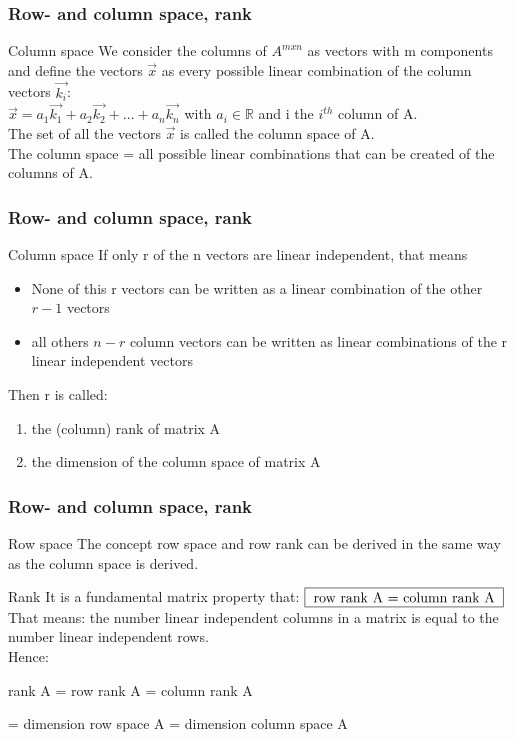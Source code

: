 \begin{frame}
	\frametitle{Row- and column space, rank}
	\begin{block}{Column space}
		We consider the columns of $A^{mxn}$ as vectors with m components and define the vectors $\overrightarrow{x}$ as every possible linear combination of the column vectors $\overrightarrow{k_i}$:\\
		$\overrightarrow{x}=a_1\overrightarrow{k_1}+a_2\overrightarrow{k_2}+...+a_n\overrightarrow{k_n}$ with $a_i\in\mathbb{R}$ and i the $i^{th}$ column of A.\\
		The set of all the vectors $\overrightarrow{x}$ is called the column space of A.\\
		The column space = all possible linear combinations that can be created of the columns of A.
		\end{block}
\end{frame}

\begin{frame}
	\frametitle{Row- and column space, rank}
	\begin{block}{Column space}
		If only r of the n vectors are linear independent, that means\\
		\begin{itemize}
			\item None of this r vectors can be written as a linear combination of the other $r-1$ vectors
			\item all others $n-r$ column vectors can be written as linear combinations of the r linear independent vectors
		\end{itemize} 
		Then r is called:
		\begin{enumerate}
			\item the (column) rank of matrix A
 			\item the dimension of the column space of matrix A
		\end{enumerate}
	\end{block}
\end{frame}

\begin{frame}
	\frametitle{Row- and column space, rank}
	\begin{block}{Row space}
		The concept row space and row rank can be derived in the same way as the column space is derived.
	\end{block}
	\begin{block}{Rank}
		It is a fundamental matrix property that: $\framebox[1.1\width]{row rank A = column rank A}$\\
		That means: the number linear independent columns in a matrix is equal to the number linear independent rows.\\ Hence: \\
		{rank A = row rank A = column rank A \par
		= dimension row space A = dimension column space A} 	
	\end{block}
\end{frame}

